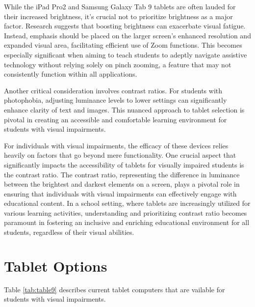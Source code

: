 \documentclass[14pt,letterpaper,twoside]{extreport}
\begin{document}
While the iPad Pro2 and Samsung Galaxy Tab 9 tablets are often lauded for their increased brightness, it's crucial not to prioritize brightness as a major factor. Research suggests that boosting brightness can exacerbate visual fatigue. Instead, emphasis should be placed on the larger screen's enhanced resolution and expanded visual area, facilitating efficient use of Zoom functions. This becomes especially significant when aiming to teach students to adeptly navigate assistive technology without relying solely on pinch zooming, a feature that may not consistently function within all applications.

Another critical consideration involves contrast ratios. For students with photophobia, adjusting luminance levels to lower settings can significantly enhance clarity of text and images. This nuanced approach to tablet selection is pivotal in creating an accessible and comfortable learning environment for students with visual impairments.

For individuals with visual impairments, the efficacy of these devices relies heavily on factors that go beyond mere functionality. One crucial aspect that significantly impacts the accessibility of tablets for visually impaired students is the contrast ratio. The contrast ratio, representing the difference in luminance between the brightest and darkest elements on a screen, plays a pivotal role in ensuring that individuals with visual impairments can effectively engage with educational content. In a school setting, where tablets are increasingly utilized for various learning activities, understanding and prioritizing contrast ratio becomes paramount in fostering an inclusive and enriching educational environment for all students, regardless of their visual abilities.


\pagebreak	\hypertarget{tablet-options}{}\section{Tablet Options}\label{tab:tablelet-options}
Table \ref{tab:table9} describes current tablet computers that are vailable for students with visual impairments.
\end{document}

